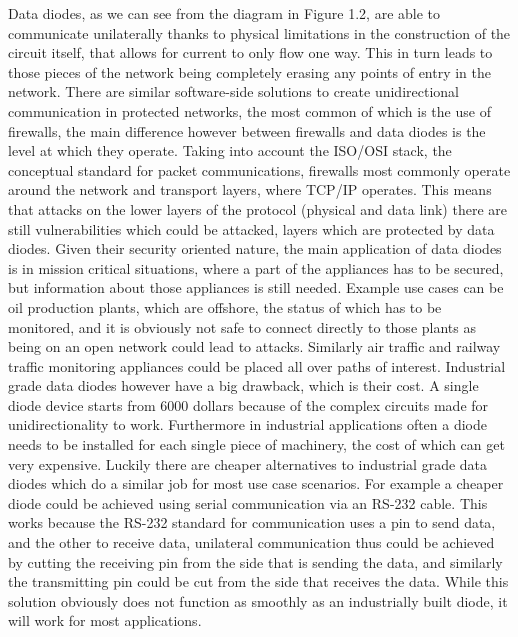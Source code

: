 \documentclass[a4paper, 12pt]{book}
\begin{document}
Data diodes, as we can see from the diagram in Figure 1.2, are able to communicate unilaterally thanks to physical limitations in the construction of the circuit itself, that allows for current to only flow one way. This in turn leads to those pieces of the network being completely erasing any points of entry in the network.
There are similar software-side solutions to create unidirectional communication in protected networks, the most common of which is the use of firewalls, the main difference however between firewalls and data diodes is the level at which they operate. Taking into account the ISO/OSI stack, the conceptual standard for packet communications, firewalls most commonly operate around the network and transport layers, where TCP/IP operates. This means that attacks on the lower layers of the protocol (physical and data link) there are still vulnerabilities which could be attacked, layers which are protected by data diodes.
Given their security oriented nature, the main application of data diodes is in mission critical situations, where a part of the appliances has to be secured, but information about those appliances is still needed. Example use cases can be oil production plants, which are offshore, the status of which has to be monitored, and it is obviously not safe to connect directly to those plants as being on an open network could lead to attacks. Similarly air traffic and railway traffic monitoring appliances could be placed all over paths of interest.
Industrial grade data diodes however have a big drawback, which is their cost. A single diode device starts from 6000 dollars because of the complex circuits made for unidirectionality to work. Furthermore in industrial applications often a diode needs to be installed for each single piece of machinery, the cost of which can get very expensive. Luckily there are cheaper alternatives to industrial grade data diodes which do a similar job for most use case scenarios. For example a cheaper diode could be achieved using serial communication via an RS-232 cable. This works because the RS-232 standard for communication uses a pin to send data, and the other to receive data, unilateral communication thus could be achieved by cutting the receiving pin from the side that is sending the data, and similarly the transmitting pin could be cut from the side that receives the data. While this solution obviously does not function as smoothly as an industrially built diode, it will work for most applications.
\end{document}
